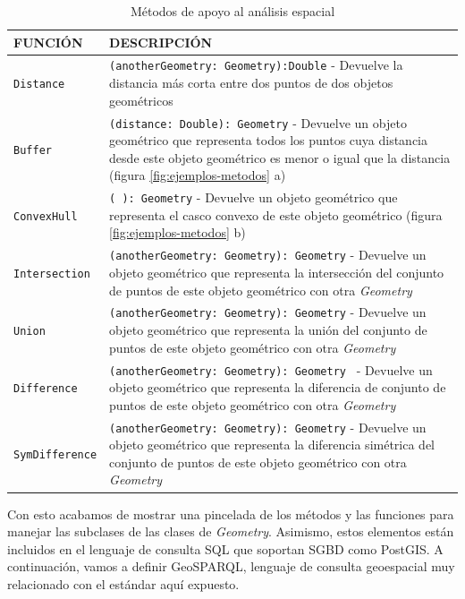 \begin{table}[H]
	\caption{Métodos de apoyo al análisis espacial}
	\label{estandar-metodos}
	\centering
	\begin{tabular}{|l|m{8.6cm}|}
		\hline
		\rowcolor[HTML]{EFEFEF} 
		{\textbf{FUNCIÓN} } & {\textbf{DESCRIPCIÓN}} \\ \hline
		\texttt{Distance}		&     \texttt{(anotherGeometry: Geometry):Double} - Devuelve la distancia más corta entre dos puntos de dos objetos geométricos        \\ \hline
		\texttt{Buffer} &     \texttt{(distance: Double): Geometry} -    Devuelve un objeto geométrico que representa todos los puntos cuya distancia desde este objeto geométrico es menor o igual que la distancia (figura \ref{fig:ejemplos-metodos} a)            \\ \hline
		\texttt{ConvexHull}	& \texttt{( ): Geometry} -     Devuelve un objeto geométrico que representa el casco convexo de este objeto geométrico (figura \ref{fig:ejemplos-metodos} b)             \\ \hline
		\texttt{Intersection} &   \texttt{(anotherGeometry: Geometry): Geometry} -    Devuelve un objeto geométrico que representa la intersección del conjunto de puntos de este objeto geométrico con otra \textit{Geometry}            \\ \hline
		\texttt{Union}	&  \texttt{(anotherGeometry: Geometry): Geometry}	-    Devuelve un objeto geométrico que representa la unión del conjunto de puntos de este objeto geométrico con otra \textit{Geometry}              \\ \hline
		\texttt{Difference} &  \texttt{(anotherGeometry: Geometry): Geometry } -  Devuelve un objeto geométrico que representa la diferencia de conjunto de puntos de este objeto geométrico con otra \textit{Geometry}            \\ \hline
		\texttt{SymDifference}	&   \texttt{(anotherGeometry: Geometry): Geometry}  - Devuelve un objeto geométrico que representa la diferencia simétrica del conjunto de puntos de este objeto geométrico con otra \textit{Geometry}                 \\ \hline
	\end{tabular}
\end{table}




 


Con esto acabamos de mostrar una pincelada de los métodos y las funciones para manejar las subclases de las clases de \textit{Geometry}. Asimismo, estos elementos están incluidos en el lenguaje de consulta SQL que soportan SGBD como PostGIS. A continuación, vamos a definir GeoSPARQL, lenguaje de consulta geoespacial muy relacionado con el estándar aquí expuesto.

